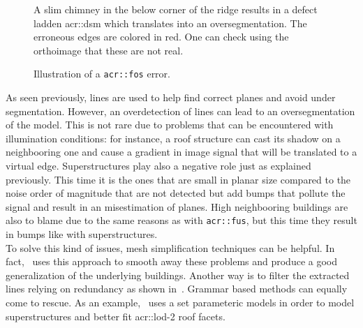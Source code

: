 \begin{figure}[htbp]
{\begin{subfloatrow}
{                                }{
                                    \caption{
                                        \label{subfig::fos_2d}
                                        A slim chimney in the below corner of the ridge results in a defect ladden \gls{acr::dsm} which translates into an oversegmentation.
                                        The erroneous edges are colored in red.
                                        One can check using the orthoimage that these are not real.
                                    }
                                }
                        \end{subfloatrow}
                    }{
                        \caption{
                            \label{fig::fos}
                            Illustration of a \texttt{\gls{acr::fos}} error.
                        }
                    }
                \end{figure}

                As seen previously, lines are used to help find correct planes and avoid under segmentation.
                However, an overdetection of lines can lead to an oversegmentation of the model.
                This is not rare due to problems that can be encountered with illumination conditions: for instance, a roof structure can cast its shadow on a neighbooring one and cause a gradient in image signal that will be translated to a virtual edge.
                Superstructures play also a negative role just as explained previously.
                This time it is the ones that are small in planar size compared to the noise order of magnitude that are not detected but add bumps that pollute the signal and result in an misestimation of planes.
                High neighbooring buildings are also to blame due to the same reasons as with \texttt{\gls{acr::fus}}, but this time they result in bumps like with superstructures.\\

                To solve this kind of issues, mesh simplification techniques can be helpful.
                In fact,~\textcite{verdie2015lod} uses this approach to smooth away these problems and produce a good generalization of the underlying buildings.
                Another way is to filter the extracted lines relying on redundancy as shown in~\textcite{michelin2013quality}.
                Grammar based methods can equally come to rescue.
                As an example,~\textcite{bredif20073d} uses a set parameteric models in order to model superstructures and better fit \gls{acr::lod}-2 roof facets.

